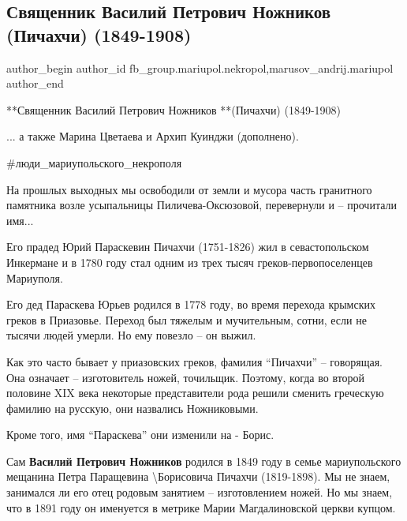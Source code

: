  
 
 
 
 

\subsection{Священник Василий Петрович Ножников (Пичахчи) (1849-1908)}
\label{sec:19_11_2021.fb.fb_group.mariupol.nekropol.1.svjaschennik_vasilij_petrovich_nozhnikov_pichahchi}
 
\ifcmt
 author_begin
   author_id fb_group.mariupol.nekropol,marusov_andrij.mariupol
 author_end
\fi

**Священник Василий Петрович Ножников **(Пичахчи) (1849-1908)

... а также Марина Цветаева и Архип Куинджи (дополнено).

\#люди\_мариупольского\_некрополя

На прошлых выходных мы освободили от земли и мусора часть гранитного памятника
возле усыпальницы Пиличева-Оксюзовой, перевернули и – прочитали имя...

Его прадед Юрий Параскевин Пичахчи (1751-1826) жил в севастопольском Инкермане
и в 1780 году стал одним из трех тысяч греков-первопоселенцев Мариуполя.

Его дед Параскева Юрьев родился в 1778 году, во время перехода крымских греков
в Приазовье. Переход был тяжелым и мучительным, сотни, если не тысячи людей
умерли. Но ему повезло – он выжил.

Как это часто бывает у приазовских греков, фамилия \enquote{Пичахчи} – говорящая. Она
означает – изготовитель ножей, точильщик. Поэтому, когда во второй половине XIX
века некоторые представители рода решили сменить греческую фамилию на русскую,
они назвались Ножниковыми.

Кроме того, имя \enquote{Параскева} они изменили на - Борис.

Сам \textbf{Василий Петрович Ножников} родился в 1849 году в семье мариупольского
мещанина Петра Паращевина \textbackslash Борисовича Пичахчи (1819-1898). Мы не знаем,
занимался ли его отец родовым занятием – изготовлением ножей. Но мы знаем, что
в 1891 году он именуется в метрике Марии Магдалиновской церкви купцом.

